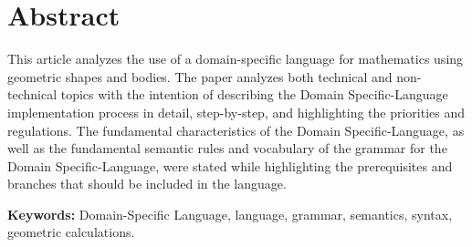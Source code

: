 \chapter*{Abstract}

This article analyzes the use of a domain-specific language for mathematics using geometric shapes and bodies. The paper analyzes both technical and non-technical topics with the intention of describing the Domain Specific-Language implementation process in detail, step-by-step, and highlighting the priorities and regulations. The fundamental characteristics of the Domain Specific-Language, as well as the fundamental semantic rules and vocabulary of the grammar for the Domain Specific-Language, were stated while highlighting the prerequisites and branches that should be included in the language.

\textbf{Keywords: } Domain-Specific Language, language, grammar, semantics, syntax, geometric calculations.